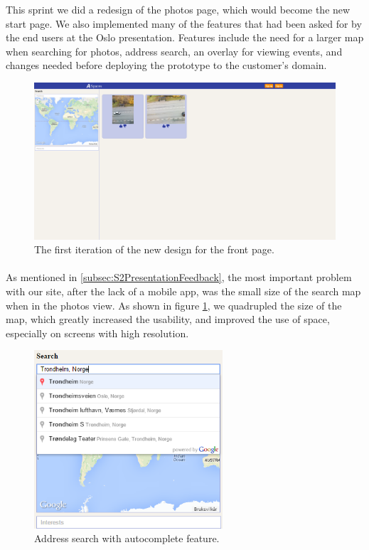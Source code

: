 This sprint we did a redesign of the photos page, which would become the new start page. We also implemented many of the features that had been asked for by the end users at the Oslo presentation. Features include the need for a larger map when searching for photos, address search, an overlay for viewing events, and changes needed before deploying the prototype to the customer's domain.

\begin{figure}[ht!]
  \centering
  \includegraphics[width=\linewidth]{./img/webpage/27Oct/Frontpage27Oct}
  \caption{The first iteration of the new design for the front page.}
  \label{fig:S5DesignImplFront27Oct}
\end{figure}

\paragraph{} As mentioned in \ref{subsec:S2PresentationFeedback}, the most important problem with our site, after the lack of a mobile app, was the small size of the search map when in the photos view. As shown in figure \ref{fig:S5DesignImplFront27Oct}, we quadrupled the size of the map, which greatly increased the usability, and improved the use of space, especially on screens with high resolution.

\begin{figure}[ht!]
  \centering
  \includegraphics[width=70mm]{./img/webpage/27Oct/AddressAutocomplete.png}
  \caption{Address search with autocomplete feature.}
  \label{fig:S5DesignImplAddressAuto}
\end{figure}

